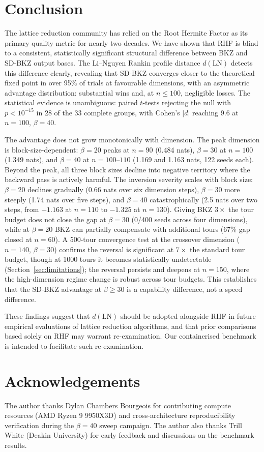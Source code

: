 \documentclass[journal=cic,version=preprint]{iacrj}
\begin{document}
\section{Conclusion}
\label{sec:conclusion}

The lattice reduction community has relied on the Root Hermite Factor as its primary quality metric for nearly two decades. We have shown that RHF is blind to a consistent, statistically significant structural difference between BKZ and SD-BKZ output bases. The Li--Nguyen Rankin profile distance $d(\mathrm{LN})$ detects this difference clearly, revealing that SD-BKZ converges closer to the theoretical fixed point in over 95\% of trials at favourable dimensions, with an asymmetric advantage distribution: substantial wins and, at $n\leq 100$, negligible losses. The statistical evidence is unambiguous: paired $t$-tests rejecting the null with $p<10^{-15}$ in 28 of the 33 complete groups, with Cohen's $|d|$ reaching 9.6 at $n=100$, $\beta=40$.

The advantage does not grow monotonically with dimension. The peak dimension is block-size-dependent: $\beta=20$ peaks at $n=90$ (0.484 nats), $\beta=30$ at $n=100$ (1.349 nats), and $\beta=40$ at $n=100$--$110$ (1.169 and 1.163 nats, 122 seeds each). Beyond the peak, all three block sizes decline into negative territory where the backward pass is actively harmful. The inversion severity scales with block size: $\beta=20$ declines gradually (0.66 nats over six dimension steps), $\beta=30$ more steeply (1.74 nats over five steps), and $\beta=40$ catastrophically (2.5 nats over two steps, from $+1.163$ at $n=110$ to $-1.325$ at $n=130$). Giving BKZ $3\times$ the tour budget does not close the gap at $\beta=30$ (0/400 seeds across four dimensions), while at $\beta=20$ BKZ can partially compensate with additional tours (67\% gap closed at $n=60$). A 500-tour convergence test at the crossover dimension ($n=140$, $\beta=30$) confirms the reversal is significant at $7\times$ the standard tour budget, though at 1000 tours it becomes statistically undetectable (Section~\ref{sec:limitations}); the reversal persists and deepens at $n=150$, where the high-dimension regime change is robust across tour budgets. This establishes that the SD-BKZ advantage at $\beta\geq 30$ is a capability difference, not a speed difference.

These findings suggest that $d(\mathrm{LN})$ should be adopted alongside RHF in future empirical evaluations of lattice reduction algorithms, and that prior comparisons based solely on RHF may warrant re-examination. Our containerised benchmark is intended to facilitate such re-examination.

\section*{Acknowledgements}

The author thanks Dylan Chambers Bourgeois for contributing compute resources (AMD Ryzen 9 9950X3D) and cross-architecture reproducibility verification during the $\beta=40$ sweep campaign. The author also thanks Trill White (Deakin University) for early feedback and discussions on the benchmark results.


\end{document}
